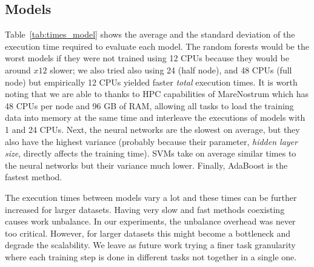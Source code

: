 \subsection{Models}

Table~\ref{tab:times_model} shows the average and the standard deviation of the execution time required to evaluate each model. The random forests would be the worst models if they were not trained using 12 CPUs because they would be around $x12$ slower; we also tried also using 24 (half node), and 48 CPUs (full node) but empirically 12 CPUs yielded faster \textit{total} execution times. It is worth noting that we are able to thanks to HPC capabilities of MareNostrum which has 48 CPUs per node and 96 GB of RAM, allowing all tasks to load the training data into memory at the same time and interleave the executions of models with 1 and 24 CPUs.
Next, the neural networks are the slowest on average, but they also have the highest variance (probably because their parameter, \textit{hidden layer size}, directly affects the training time). SVMs take on average similar times to the neural networks but their variance much lower. Finally, AdaBoost is the fastest method.

The execution times between models vary a lot and these times can be further increased for larger datasets. Having very slow and fast methods coexisting causes work unbalance. In our experiments, the unbalance overhead was never too critical. However, for larger datasets this might become a bottleneck and degrade the scalability. We leave as future work trying a finer task granularity where each training step is done in different tasks not together in a single one.

